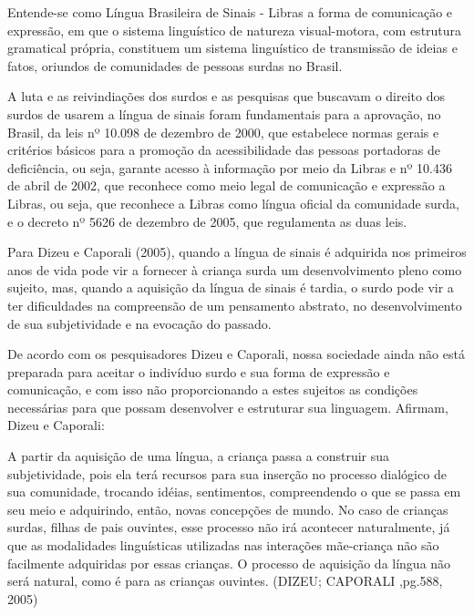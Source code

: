 \documentclass[brasil]{abnt}
\begin{document}
				\begin{citacao} Entende-se como Língua Brasileira de Sinais - Libras a forma de comunicação e expressão, em que o sistema linguístico de natureza visual-motora, com estrutura gramatical própria, constituem
								um sistema linguístico de transmissão de ideias e fatos, oriundos de comunidades de pessoas surdas no Brasil.
				\end{citacao}
				
			A luta e as reivindiações dos surdos e as pesquisas que buscavam o direito dos surdos de usarem a língua de sinais foram fundamentais para a aprovação, no Brasil, da leis nº 10.098 de dezembro de 2000,
			que estabelece normas gerais e critérios básicos para a promoção da acessibilidade das pessoas portadoras de deficiência, ou seja, garante acesso à informação por meio da Libras e nº 10.436
			de abril de 2002, que reconhece como meio legal de comunicação e expressão a Libras, ou seja, que reconhece a Libras como língua oficial da comunidade surda, e o decreto nº 5626 de dezembro de 2005, que 
			regulamenta as duas leis.
			
			Para Dizeu e Caporali (2005), quando a língua de sinais é adquirida nos primeiros anos de vida pode vir a fornecer à criança surda um desenvolvimento pleno como sujeito, mas, quando a aquisição da 
			língua de sinais é tardia, o surdo pode vir a ter dificuldades na compreensão de um pensamento abstrato, no desenvolvimento de sua subjetividade e na evocação do passado.
			
			De acordo com os pesquisadores Dizeu e Caporali, nossa sociedade ainda não está preparada para aceitar o indivíduo surdo e sua forma de expressão e comunicação, e com isso não proporcionando a estes sujeitos
			as condições necessárias para que possam desenvolver e estruturar sua linguagem. Afirmam, Dizeu e Caporali:
			
				\begin{citacao}A partir da aquisição de uma língua, a criança passa a construir sua subjetividade, pois ela terá recursos para sua inserção no processo dialógico de sua comunidade, trocando idéias,
								sentimentos, compreendendo o que se passa em seu meio e adquirindo, então, novas concepções de mundo. No caso de crianças surdas, filhas de pais ouvintes, esse processo não irá acontecer 
								naturalmente, já que as modalidades linguísticas utilizadas nas interações mãe-criança não são facilmente adquiridas por essas crianças. O processo de aquisição da língua não será
								natural, como é para as crianças ouvintes. (DIZEU; CAPORALI ,pg.588, 2005)
				\end{citacao}
			
\end{document}
